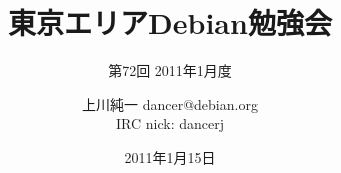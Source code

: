 




\documentclass[cjk,dvipdfmx,12pt]{beamer}
\usepackage{monthlypresentation}



\title{東京エリアDebian勉強会}
\subtitle{第72回 2011年1月度}
\author{上川純一 dancer@debian.org\\IRC nick: dancerj}
\date{2011年1月15日}



